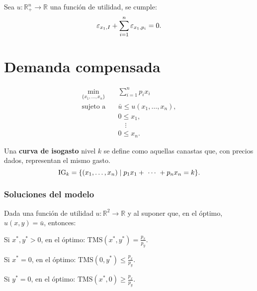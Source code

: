 \documentclass[8pt,a4paper]{extarticle}
\begin{document}
\begin{multicols}{3}
	\begin{boxtheo}
		Sea $u : \mathbb{R}^n_+ \to \mathbb{R}$ una función de utilidad, se cumple:
		\[
			\E_{x_1, I} + \sum_{i=1}^{n} \E_{x_1, p_{i}} = 0
			.\]
	\end{boxtheo}

	\newpage

	\section{Demanda compensada}

	\begin{equation*}
		\begin{aligned}
			\min_{\{x_1, \ldots, x_n\}}\	 & \sum_{i=1}^{n} p_i x_i           \\
			\text{sujeto a} \quad        & \bar{u} \le u(x_1, \ldots, x_n), \\
			                             & 0 \le x_1,                       \\
			                             & \quad \vdots                     \\
			                             & 0 \le x_n.
		\end{aligned}
	\end{equation*}

	\begin{boxdef}
		Una \textbf{curva de isogasto} nivel $k$ se define como aquellas canastas que, con precios dados, representan el mismo gasto. \\
		$$\text{\normalfont IG}_k = \{(x_1, \ldots, x_n)  \mid p_1 x_1 +\ \cdots\ + p_n x_n = k\}.$$
	\end{boxdef}

	\subsubsection*{Soluciones del modelo}

	Dada una función de utilidad $u : \mathbb{R}^2 \to \mathbb{R}$ y al suponer que, en el óptimo, $u(x, y) = \bar{u}$, entonces:

	\begin{bulletlist}
		\item Si $x^*, y^* > 0$, en el óptimo: $\displaystyle \text{TMS} (x^*, y^*) = \frac{p_x}{p_y}$.
		\item Si $x^* = 0$, en el óptimo: $\displaystyle \text{TMS} \left(0, y^* \right) \le \frac{p_x}{p_y}$.
		\item Si $y^* = 0$, en el óptimo: $\displaystyle \text{TMS} \left(x^*, 0\right) \ge \frac{p_x}{p_y}$.
	\end{bulletlist}


\end{multicols}
\end{document}
